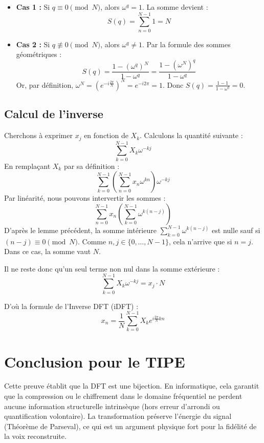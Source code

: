 \documentclass[11pt,a4paper]{article}
\begin{document}
\begin{itemize}
    \item \textbf{Cas 1 :} Si $q \equiv 0 \pmod N$, alors $\omega^q = 1$. La somme devient :
    \[ S(q) = \sum_{n=0}^{N-1} 1 = N \]
    \item \textbf{Cas 2 :} Si $q \not\equiv 0 \pmod N$, alors $\omega^q \neq 1$. Par la formule des sommes géométriques :
    \[ S(q) = \frac{1 - (\omega^q)^N}{1 - \omega^q} = \frac{1 - (\omega^N)^q}{1 - \omega^q} \]
    Or, par définition, $\omega^N = (e^{-i\frac{2\pi}{N}})^N = e^{-i2\pi} = 1$. Donc $S(q) = \frac{1 - 1}{1 - \omega^q} = 0$.
\end{itemize}

\subsection{Calcul de l'inverse}
Cherchons à exprimer $x_j$ en fonction de $X_k$. Calculons la quantité suivante :
\[ \sum_{k=0}^{N-1} X_k \omega^{-kj} \]
En remplaçant $X_k$ par sa définition :
\[ \sum_{k=0}^{N-1} \left( \sum_{n=0}^{N-1} x_n \omega^{kn} \right) \omega^{-kj} \]
Par linéarité, nous pouvons intervertir les sommes :
\[ \sum_{n=0}^{N-1} x_n \left( \sum_{k=0}^{N-1} \omega^{k(n-j)} \right) \]
D'après le lemme précédent, la somme intérieure $\sum_{k=0}^{N-1} \omega^{k(n-j)}$ est nulle sauf si $(n-j) \equiv 0 \pmod N$. Comme $n, j \in \{0, \dots, N-1\}$, cela n'arrive que si $n = j$. Dans ce cas, la somme vaut $N$.

Il ne reste donc qu'un seul terme non nul dans la somme extérieure :
\[ \sum_{k=0}^{N-1} X_k \omega^{-kj} = x_j \cdot N \]

D'où la formule de l'Inverse DFT (iDFT) :
\begin{equation}
x_n = \frac{1}{N} \sum_{k=0}^{N-1} X_k e^{i\frac{2\pi}{N} kn}
\end{equation}

\section{Conclusion pour le TIPE}
Cette preuve établit que la DFT est une bijection. En informatique, cela garantit que la compression ou le chiffrement dans le domaine fréquentiel ne perdent aucune information structurelle intrinsèque (hors erreur d'arrondi ou quantification volontaire). La transformation préserve l'énergie du signal (Théorème de Parseval), ce qui est un argument physique fort pour la fidélité de la voix reconstruite.
\end{document}

